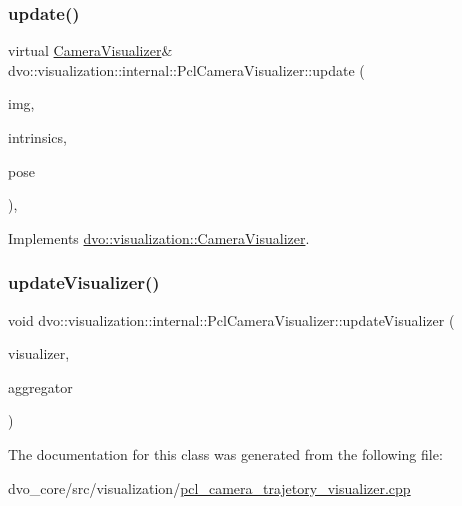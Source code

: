 \subsubsection{\texorpdfstring{update()}{update()}}
{\footnotesize\ttfamily virtual \mbox{\hyperlink{classdvo_1_1visualization_1_1_camera_visualizer}{Camera\+Visualizer}}\& dvo\+::visualization\+::internal\+::\+Pcl\+Camera\+Visualizer\+::update (\begin{DoxyParamCaption}\item[{const \mbox{\hyperlink{structdvo_1_1core_1_1_rgbd_image}{dvo\+::core\+::\+Rgbd\+Image}} \&}]{img,  }\item[{const \mbox{\hyperlink{structdvo_1_1core_1_1_intrinsic_matrix}{dvo\+::core\+::\+Intrinsic\+Matrix}} \&}]{intrinsics,  }\item[{const Eigen\+::\+Affine3d \&}]{pose }\end{DoxyParamCaption})\hspace{0.3cm}{\ttfamily [inline]}, {\ttfamily [virtual]}}



Implements \mbox{\hyperlink{classdvo_1_1visualization_1_1_camera_visualizer_afd83119e63048b0229820045d54c95ec}{dvo\+::visualization\+::\+Camera\+Visualizer}}.

\mbox{\label{classdvo_1_1visualization_1_1internal_1_1_pcl_camera_visualizer_adbc6ea5a07dace4e06773d568986424b}} 
\subsubsection{\texorpdfstring{update\+Visualizer()}{updateVisualizer()}}
{\footnotesize\ttfamily void dvo\+::visualization\+::internal\+::\+Pcl\+Camera\+Visualizer\+::update\+Visualizer (\begin{DoxyParamCaption}\item[{pcl\+::visualization\+::\+P\+C\+L\+Visualizer \&}]{visualizer,  }\item[{\mbox{\hyperlink{classdvo_1_1visualization_1_1_point_cloud_aggregator}{Point\+Cloud\+Aggregator}} \&}]{aggregator }\end{DoxyParamCaption})\hspace{0.3cm}{\ttfamily [inline]}}



The documentation for this class was generated from the following file\+:\begin{DoxyCompactItemize}
\item 
dvo\+\_\+core/src/visualization/\mbox{\hyperlink{pcl__camera__trajetory__visualizer_8cpp}{pcl\+\_\+camera\+\_\+trajetory\+\_\+visualizer.\+cpp}}\end{DoxyCompactItemize}
